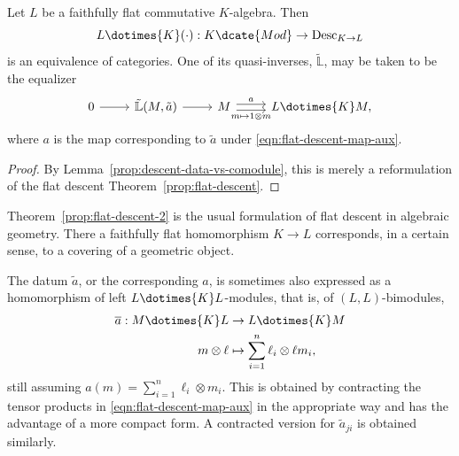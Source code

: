 \begin{theorem}\label{prop:flat-descent-2}
	Let $L$ be a faithfully flat commutative $K$-algebra. Then
	\[ L \dotimes{K} (\cdot): K\dcate{Mod} \to \mathrm{Desc}_{K \to L} \]
	is an equivalence of categories. One of its quasi-inverses,
	$\tilde{\mathbb{L}}$, may be taken to be the equalizer
	\[\begin{tikzcd}
		0 \arrow[r] & \tilde{\mathbb{L}}(M, \tilde{a}) \arrow[r] & M \arrow[shift left, r, "a"] \arrow[shift right, r, "{m \mapsto 1 \otimes m}"'] & L \dotimes{K} M,
	\end{tikzcd}\]
	where $a$ is the map corresponding to $\tilde a$ under
	\eqref{eqn:flat-descent-map-aux}.
\end{theorem}
\begin{proof}
	By Lemma~\ref{prop:descent-data-vs-comodule}, this is merely a
	reformulation of the flat descent Theorem~\ref{prop:flat-descent}.
\end{proof}

Theorem~\ref{prop:flat-descent-2} is the usual formulation of flat descent in
algebraic geometry. There a faithfully flat homomorphism $K\to L$
corresponds, in a certain sense, to a covering of a geometric object.

The datum $\tilde a$, or the corresponding $a$, is sometimes also expressed
as a homomorphism of left $L\dotimes{K}L$-modules, that is, of
$(L,L)$-bimodules,
\begin{align*}
	\overline{a}: M \dotimes{K} L & \to L \dotimes{K} M \\
	m \otimes \ell & \mapsto \sum_{i=1}^n \ell_i \otimes \ell m_i,
\end{align*}
still assuming $a(m)=\sum_{i=1}^n\ell_i\otimes m_i$. This is obtained by
contracting the tensor products in \eqref{eqn:flat-descent-map-aux} in the
appropriate way and has the advantage of a more compact form. A contracted
version for $\tilde a_{ji}$ is obtained similarly.

